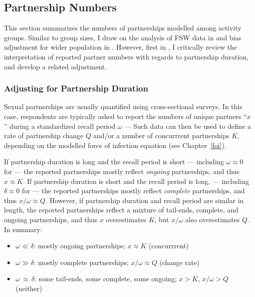 \subsection{Partnership Numbers}\label{model.par.pnum}
This section summarizes the numbers of partnerships modelled among activity groups.
Similar to group sizes, I draw on the
analysis of FSW data in  and
bias adjustment for wider population in .
However, first in ,
I critically review the interpretation of reported partner numbers
with regards to partnership duration, and develop a related adjustment.
\subsubsection{Adjusting for Partnership Duration}\label{model.par.pnum.adj}
Sexual partnerships are usually quantified using cross-sectional surveys.
In this case, respondents are typically asked to report the numbers of unique partners ``$x$''
during a standardized recall period $\omega$
--- \eg {}
Such data can then be used to define
a rate of partnership change $Q$ and/or a number of concurrrent partnerships $K$,
depending on the modelled force of infection equation (see Chapter~\ref{foi}).
\par
If partnership duration is long and the recall period is short
--- including $\omega \approx 0$ for
 ---
the reported partnerships mostly reflect \emph{ongoing} partnerships,
and thus $x \approx K$.
If partnership duration is short and the recall period is long,
--- including $\delta \approx 0$ for
 ---
the reported partnerships mostly reflect \emph{complete} partnerships,
and thus $x/\omega \approx Q$.
However, if partnership duration and recall period are similar in length,
the reported partnerships reflect a mixture of tail-ends, complete, and ongoing partnerships,
and thus $x$ overestimates $K$, but $x/\omega$ also overestimates $Q$.
In summary:
\begin{itemize}
  \item $\omega \ll \delta$: mostly ongoing partnerships;
  $x \approx K$ (concurrrent)
  \item $\omega \gg \delta$: mostly complete partnerships;
  $x/\omega \approx Q$ (change rate)
  \item $\omega\,\approx\,\delta$: some tail-ends, some complete, some ongoing;
  $x > K$, $x/\omega > Q$ (neither)
\end{itemize}
